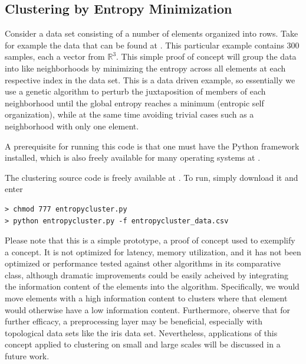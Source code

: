 \documentclass[english]{article}
\begin{document}
\subsection{Clustering by Entropy Minimization}

Consider a data set consisting of a number of elements organized into
rows. Take for example the data that can be found at \cite{web2}.
This particular example contains 300 samples, each a vector from $\mathbb{R}^{3}$.
This simple proof of concept will group the data into like neighborhoods
by minimizing the entropy across all elements at each respective index
in the data set. This is a data driven example, so essentially we
use a genetic algorithm to perturb the juxtaposition of members of
each neighborhood until the global entropy reaches a minimum (entropic
self organization), while at the same time avoiding trivial cases
such as a neighborhood with only one element.

A prerequisite for running this code is that one must have the Python
framework installed, which is also freely available for many operating
systems at \cite{web3}.

The clustering source code is freely available at \cite{web1}. To
run, simply download it and enter

\begin{lstlisting}
> chmod 777 entropycluster.py
> python entropycluster.py -f entropycluster_data.csv
\end{lstlisting}


Please note that this is a simple prototype, a proof of concept used
to exemplify a concept. It is not optimized for latency, memory utilization,
and it has not been optimized or performance tested against other
algorithms in its comparative class, although dramatic improvements
could be easily acheived by integrating the information content of
the elements into the algorithm. Specifically, we would move elements
with a high information content to clusters where that element would
otherwise have a low information content. Furthermore, observe that
for further efficacy, a preprocessing layer may be beneficial, especially
with topological data sets like the iris data set. Nevertheless, applications
of this concept applied to clustering on small and large scales will
be discussed in a future work.
\end{document}
